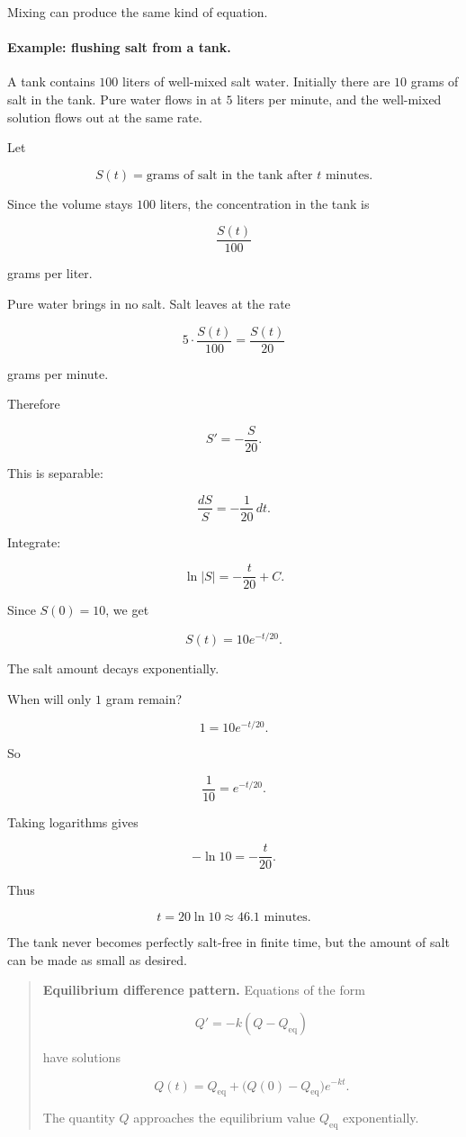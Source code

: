 Mixing can produce the same kind of equation.

\paragraph{Example: flushing salt from a tank.}
A tank contains \(100\) liters of well-mixed salt water.  Initially there are \(10\) grams of
salt in the tank.  Pure water flows in at \(5\) liters per minute, and the well-mixed
solution flows out at the same rate.

Let

\[
S(t)=\text{grams of salt in the tank after \(t\) minutes}.
\]

Since the volume stays \(100\) liters, the concentration in the tank is

\[
\frac{S(t)}{100}
\]

grams per liter.

Pure water brings in no salt.  Salt leaves at the rate

\[
5\cdot\frac{S(t)}{100}
=
\frac{S(t)}{20}
\]

grams per minute.

Therefore

\[
S'=-\frac{S}{20}.
\]

This is separable:

\[
\frac{dS}{S}=-\frac{1}{20}\,dt.
\]

Integrate:

\[
\ln|S|=-\frac{t}{20}+C.
\]

Since \(S(0)=10\), we get

\[
\boxed{
S(t)=10e^{-t/20}.
}
\]

The salt amount decays exponentially.

When will only \(1\) gram remain?

\[
1=10e^{-t/20}.
\]

So

\[
\frac{1}{10}=e^{-t/20}.
\]

Taking logarithms gives

\[
-\ln10=-\frac{t}{20}.
\]

Thus

\[
\boxed{
t=20\ln10\approx46.1\text{ minutes}.
}
\]

The tank never becomes perfectly salt-free in finite time, but the amount of salt can be
made as small as desired.

\begin{quote}
\textbf{Equilibrium difference pattern.}
Equations of the form

\[
Q'=-k(Q-Q_{\text{eq}})
\]

have solutions

\[
\boxed{
Q(t)=Q_{\text{eq}}+\bigl(Q(0)-Q_{\text{eq}}\bigr)e^{-kt}.
}
\]

The quantity \(Q\) approaches the equilibrium value \(Q_{\text{eq}}\) exponentially.
\end{quote}

